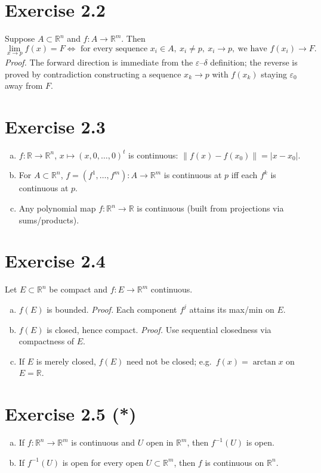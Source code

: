 \documentclass[11pt,a4paper]{article}
\begin{document}
\section*{Exercise 2.2}
Suppose $A\subset\mathbb{R}^n$ and $f:A\to\mathbb{R}^m$. Then
\[
\lim_{x\to p}f(x)=F \iff \text{ for every sequence } x_i\in A,\ x_i\neq p,\ x_i\to p,\ \text{we have } f(x_i)\to F.
\]
\textit{Proof.} The forward direction is immediate from the $\varepsilon$--$\delta$ definition; the reverse is proved by contradiction constructing a sequence $x_k\to p$ with $f(x_k)$ staying $\varepsilon_0$ away from $F$.

\section*{Exercise 2.3}
\begin{enumerate}[a)]
\item $f:\mathbb{R}\to\mathbb{R}^n$, $x\mapsto (x,0,\dots,0)^t$ is continuous: $\|f(x)-f(x_0)\|=|x-x_0|$.
\item For $A\subset\mathbb{R}^n$, $f=(f^1,\dots,f^m):A\to\mathbb{R}^m$ is continuous at $p$ iff each $f^k$ is continuous at $p$.
\item Any polynomial map $f:\mathbb{R}^n\to\mathbb{R}$ is continuous (built from projections via sums/products).
\end{enumerate}

\section*{Exercise 2.4}
Let $E\subset\mathbb{R}^n$ be compact and $f:E\to\mathbb{R}^m$ continuous.
\begin{enumerate}[a)]
\item $f(E)$ is bounded. \textit{Proof.} Each component $f^j$ attains its max/min on $E$.
\item $f(E)$ is closed, hence compact. \textit{Proof.} Use sequential closedness via compactness of $E$.
\item If $E$ is merely closed, $f(E)$ need not be closed; e.g.\ $f(x)=\arctan x$ on $E=\mathbb{R}$.
\end{enumerate}

\section*{Exercise 2.5 (*)}
\begin{enumerate}[a)]
\item If $f:\mathbb{R}^n\to\mathbb{R}^m$ is continuous and $U$ open in $\mathbb{R}^m$, then $f^{-1}(U)$ is open.
\item If $f^{-1}(U)$ is open for every open $U\subset\mathbb{R}^m$, then $f$ is continuous on $\mathbb{R}^n$.
\end{enumerate}
\end{document}
